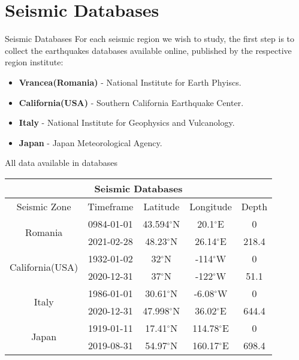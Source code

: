 \section{Seismic Databases}


\begin{frame}{Seismic Databases}
For each seismic region we wish to study, the first step is to collect the earthquakes databases available online, published by the respective region institute:
\begin{itemize}
	\item {\bf Vrancea(Romania)} - National Institute for Earth Phyiscs.
	\item {\bf California(USA)} - Southern California Earthquake Center.
	\item {\bf Italy} - National Institute for Geophysics and Vulcanology.
	\item {\bf Japan} - Japan Meteorological Agency.
\end{itemize}
\end{frame}


\begin{frame}{All data available in databases}
\begin{center}
\centering
 \begin{tabular}{ |c||c|c|c|c|  }

 \hline
 \multicolumn{5}{|c|}{Seismic Databases} \\
 \hline
 Seismic Zone & Timeframe & Latitude & Longitude & Depth\\
 \hline
 \hline
 \multirow{2}{8em}{Romania} & 0984-01-01 & 43.594$^{\circ}$N & 20.1$^{\circ}$E & 0\\
 & 2021-02-28 & 48.23$^{\circ}$N & 26.14$^{\circ}$E & 218.4\\
 \hline
 \multirow{2}{8em}{California(USA)} & 1932-01-02 & 32$^{\circ}$N & -114$^{\circ}$W & 0\\
 & 2020-12-31 & 37$^{\circ}$N & -122$^{\circ}$W & 51.1\\
 \hline
 \multirow{2}{8em}{Italy} & 1986-01-01 & 30.61$^{\circ}$N & -6.08$^{\circ}$W & 0\\
 & 2020-12-31 & 47.998$^{\circ}$N & 36.02$^{\circ}$E & 644.4\\
 \hline
 \multirow{2}{8em}{Japan} & 1919-01-11 & 17.41$^{\circ}$N & 114.78$^{\circ}$E & 0\\
 & 2019-08-31 & 54.97$^{\circ}$N & 160.17$^{\circ}$E & 698.4\\
 \hline
 \end{tabular}
\end{center}
\end{frame}


